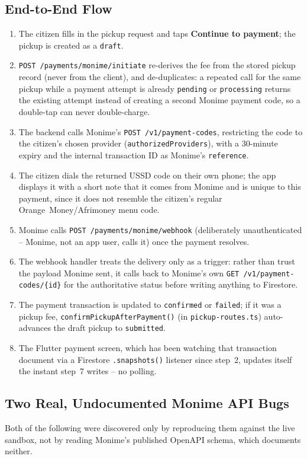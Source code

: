 \subsection{End-to-End Flow}
\begin{enumerate}[leftmargin=1.4cm]
  \item The citizen fills in the pickup request and taps \textbf{Continue to
    payment}; the pickup is created as a \texttt{draft}.
  \item \texttt{POST~/payments/monime/initiate} re-derives the fee from the
    stored pickup record (never from the client), and de-duplicates: a
    repeated call for the same pickup while a payment attempt is already
    \texttt{pending} or \texttt{processing} returns the existing attempt instead
    of creating a second Monime payment code, so a double-tap can never
    double-charge.
  \item The backend calls Monime's \texttt{POST~/v1/payment-codes},
    restricting the code to the citizen's chosen provider
    (\texttt{authorizedProviders}), with a 30-minute expiry and the internal
    transaction ID as Monime's \texttt{reference}.
  \item The citizen dials the returned USSD code on their own phone; the app
    displays it with a short note that it comes from Monime and is unique to
    this payment, since it does not resemble the citizen's regular
    Orange~Money/Afrimoney menu code.
  \item Monime calls \texttt{POST~/payments/monime/webhook}
    (deliberately unauthenticated -- Monime, not an app user, calls it) once the
    payment resolves.
  \item The webhook handler treats the delivery only as a trigger: rather than
    trust the payload Monime sent, it calls back to Monime's own
    \texttt{GET~/v1/payment-codes/\{id\}} for the authoritative status before
    writing anything to Firestore.
  \item The payment transaction is updated to \texttt{confirmed} or
    \texttt{failed}; if it was a pickup fee, \texttt{confirmPickupAfterPayment()}
    (in \texttt{pickup-routes.ts}) auto-advances the draft pickup to
    \texttt{submitted}.
  \item The Flutter payment screen, which has been watching that transaction
    document via a Firestore \texttt{.snapshots()} listener since step~2, updates
    itself the instant step~7 writes -- no polling.
\end{enumerate}

\subsection{Two Real, Undocumented Monime API Bugs}
Both of the following were discovered only by reproducing them against the
live sandbox, not by reading Monime's published OpenAPI schema, which
documents neither.

